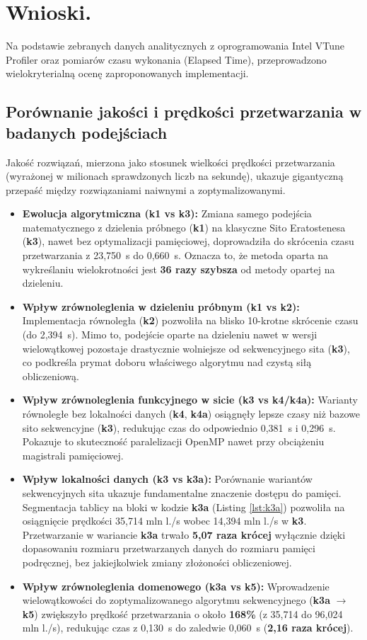 \documentclass[10pt]{article}
\begin{document}
\newpage
\section{Wnioski.}

Na podstawie zebranych danych analitycznych z oprogramowania Intel VTune Profiler oraz pomiarów czasu wykonania (Elapsed Time),
 przeprowadzono wielokryterialną ocenę zaproponowanych implementacji.

\subsection{Porównanie jakości i prędkości przetwarzania w badanych podejściach}
Jakość rozwiązań, mierzona jako stosunek wielkości prędkości przetwarzania (wyrażonej w milionach sprawdzonych liczb na sekundę),
 ukazuje gigantyczną przepaść między rozwiązaniami naiwnymi a zoptymalizowanymi. 

\begin{itemize}
    \item \textbf{Ewolucja algorytmiczna (k1 vs k3):} Zmiana samego podejścia matematycznego z dzielenia próbnego (\textbf{k1}) na klasyczne Sito Eratostenesa (\textbf{k3}),
	 nawet bez optymalizacji pamięciowej, doprowadziła do skrócenia czasu przetwarzania z 23,750~s do 0,660~s. Oznacza to, że metoda oparta na wykreślaniu wielokrotności jest
	  \textbf{36 razy szybsza} od metody opartej na dzieleniu. 
    \item \textbf{Wpływ zrównoleglenia w dzieleniu próbnym (k1 vs k2):} Implementacja równoległa (\textbf{k2}) pozwoliła na blisko 10-krotne skrócenie czasu (do 2,394~s). 
    Mimo to, podejście oparte na dzieleniu nawet w wersji wielowątkowej pozostaje drastycznie wolniejsze od sekwencyjnego sita (\textbf{k3}), co podkreśla 
    prymat doboru właściwego algorytmu nad czystą siłą obliczeniową.
    \item \textbf{Wpływ zrównoleglenia funkcyjnego w sicie (k3 vs k4/k4a):} Warianty równoległe bez lokalności danych (\textbf{k4}, \textbf{k4a}) 
    osiągnęły lepsze czasy niż bazowe sito sekwencyjne (\textbf{k3}), redukując czas do odpowiednio 0,381~s i 0,296~s. Pokazuje to skuteczność 
    paralelizacji OpenMP nawet przy obciążeniu magistrali pamięciowej.
    \item \textbf{Wpływ lokalności danych (k3 vs k3a):} Porównanie wariantów sekwencyjnych sita ukazuje fundamentalne znaczenie dostępu do pamięci. Segmentacja tablicy na bloki 
	w kodzie \textbf{k3a} (Listing \ref{lst:k3a}) pozwoliła na osiągnięcie prędkości 35,714 mln l./s wobec 14,394 mln l./s w \textbf{k3}. Przetwarzanie w wariancie \textbf{k3a} 
	trwało \textbf{5,07 raza krócej} wyłącznie dzięki dopasowaniu rozmiaru przetwarzanych danych do rozmiaru pamięci podręcznej, bez jakiejkolwiek zmiany złożoności obliczeniowej.
    \item \textbf{Wpływ zrównoleglenia domenowego (k3a vs k5):} Wprowadzenie wielowątkowości do zoptymalizowanego algorytmu sekwencyjnego (\textbf{k3a} $\rightarrow$ \textbf{k5}) zwiększyło
	 prędkość przetwarzania o około \textbf{168\%} (z 35,714 do 96,024 mln l./s), redukując czas z 0,130~s do zaledwie 0,060~s (\textbf{2,16 raza krócej}).
\end{itemize}
\end{document}
